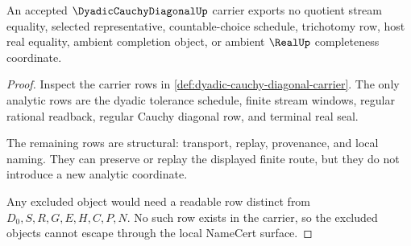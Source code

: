 \begin{theorem}
\label{thm:dyadic-cauchy-diagonal-nonescape}
An accepted $\DyadicCauchyDiagonalUp$ carrier exports no quotient stream equality, selected representative, countable-choice schedule, trichotomy row, host real equality, ambient completion object, or ambient $\RealUp$ completeness coordinate.
\end{theorem}
\begin{proof}
Inspect the carrier rows in \autoref{def:dyadic-cauchy-diagonal-carrier}. The only analytic rows are the dyadic tolerance schedule, finite stream windows, regular rational readback, regular Cauchy diagonal row, and terminal real seal.

The remaining rows are structural: transport, replay, provenance, and local naming. They can preserve or replay the displayed finite route, but they do not introduce a new analytic coordinate.

Any excluded object would need a readable row distinct from $D_0,S,R,G,E,H,C,P,N$. No such row exists in the carrier, so the excluded objects cannot escape through the local NameCert surface.
\end{proof}




